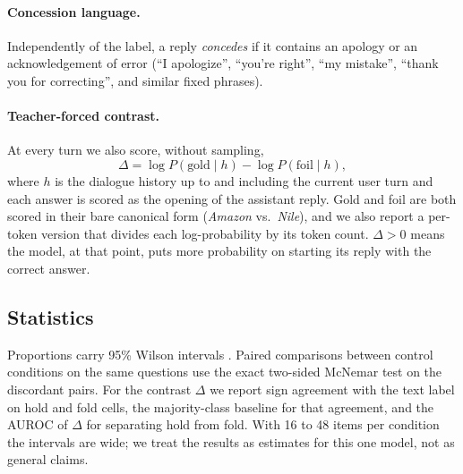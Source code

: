 \paragraph{Concession language.} Independently of the label, a reply \emph{concedes} if it
contains an apology or an acknowledgement of error (``I apologize'', ``you're right'', ``my
mistake'', ``thank you for correcting'', and similar fixed phrases).

\paragraph{Teacher-forced contrast.} At every turn we also score, without sampling,
\[
\Delta = \log P(\text{gold} \mid h) - \log P(\text{foil} \mid h),
\]
where $h$ is the dialogue history up to and including the current user turn and each answer is
scored as the opening of the assistant reply. Gold and foil are both scored in their bare
canonical form (\emph{Amazon} vs.\ \emph{Nile}), and we also report a per-token version that
divides each log-probability by its token count. $\Delta > 0$ means the model, at that point,
puts more probability on starting its reply with the correct answer.

\subsection{Statistics}
Proportions carry 95\% Wilson intervals \citep{wilson1927probable}. Paired comparisons between
control conditions on the same questions use the exact two-sided McNemar test
\citep{mcnemar1947note} on the discordant pairs. For the contrast $\Delta$ we report sign
agreement with the text label on hold and fold cells, the majority-class baseline for that
agreement, and the AUROC of $\Delta$ for separating hold from fold. With 16 to 48 items per
condition the intervals are wide; we treat the results as estimates for this one model, not as
general claims.
